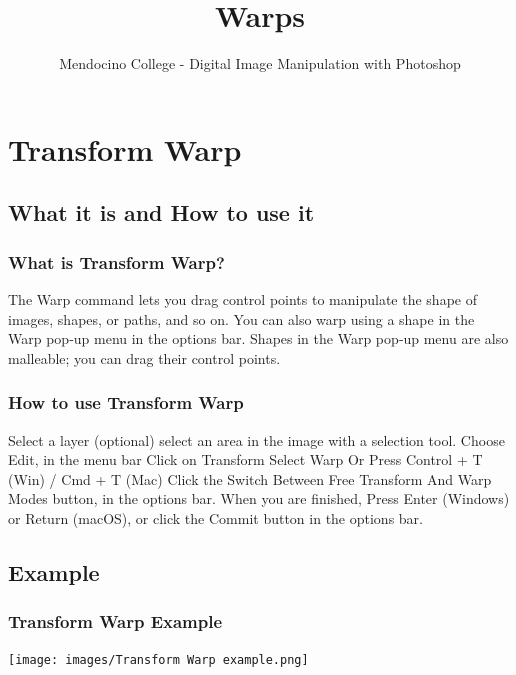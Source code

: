 \documentclass{beamer}
\title{Warps}
\author{Mendocino College - Digital Image Manipulation with Photoshop}
\date{\vspace{-5em}}
\begin{document}
	{
		\begin{frame}
			\vspace{-35pt}
			\maketitle
		\end{frame}
	}
		
		
\section{Transform Warp}

\subsection{What it is and How to use it}		

	\begin{frame}
		\frametitle{What is Transform Warp?}
		\begin{outline}
			\1 The Warp command lets you drag control points to manipulate the shape of images, shapes, or paths, and so on. 
			\1 You can also warp using a shape in the Warp pop‑up menu in the options bar. 
			\1 Shapes in the Warp pop‑up menu are also malleable; you can drag their control points.
		\end{outline}
	\end{frame}

	\begin{frame}
	\frametitle{How to use Transform Warp}
	\begin{outline}
		\1 Select a layer 
		\2 (optional) select an area in the image with a selection tool.  
		\1 Choose Edit, in the menu bar
		\2 Click on Transform 
		\2 Select Warp 
		\1 Or Press Control + T (Win) / Cmd + T (Mac) 
		\2 Click the Switch Between Free Transform And Warp Modes button, in the options bar.
		\1 When you are finished, Press Enter (Windows) or Return (macOS), or click the Commit button in the options bar.
	\end{outline}
\end{frame}

\subsection{Example}		
	\begin{frame}
		\frametitle{Transform Warp Example}
		\begin{center}
			\texttt{[image: images/Transform Warp example.png]}
		\end{center}
	\end{frame}
\end{document}
